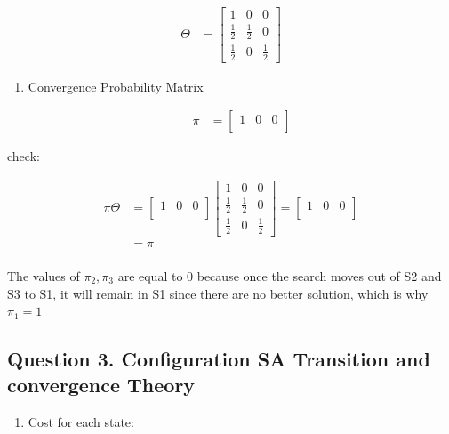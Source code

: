 \documentclass[11pt]{article}
\providecommand{\tightlist}{%
      \setlength{\itemsep}{0pt}\setlength{\parskip}{0pt}}
\begin{document}
\begin{align*}
\Theta &= 
\begin{bmatrix}
1 & 0 & 0 \\
\frac{1}{2} & \frac{1}{2} & 0 \\
\frac{1}{2} & 0 & \frac{1}{2}
\end{bmatrix}
\end{align*}

\begin{enumerate}
\def\labelenumi{\alph{enumi})}
\setcounter{enumi}{2}
\tightlist
\item
  Convergence Probability Matrix

  \begin{align*}
  \pi &= 
  \begin{bmatrix}
  1& 0 & 0 \\
  \end{bmatrix}
  \end{align*}
\end{enumerate}

check:

\begin{align*}
\pi \Theta &=
\begin{bmatrix}
1 & 0 & 0 \\
\end{bmatrix}
\begin{bmatrix}
1 & 0 & 0 \\
\frac{1}{2} & \frac{1}{2} & 0 \\
\frac{1}{2} & 0 & \frac{1}{2}
\end{bmatrix} 
= 
\begin{bmatrix}
1 & 0 & 0 \\
\end{bmatrix}\\
&= \pi \\
\end{align*}

The values of \(\pi_2,\pi_3\) are equal to 0 because once the search
moves out of S2 and S3 to S1, it will remain in S1 since there are no
better solution, which is why \(\pi_1 =1\) 

    \subsection*{Question 3. Configuration SA Transition and convergence
Theory}\label{question-3.-configuration-sa-transition-and-convergence-theory}

    \begin{enumerate}
\def\labelenumi{\alph{enumi})}
\tightlist
\item
  Cost for each state:
\end{enumerate}
\end{document}
